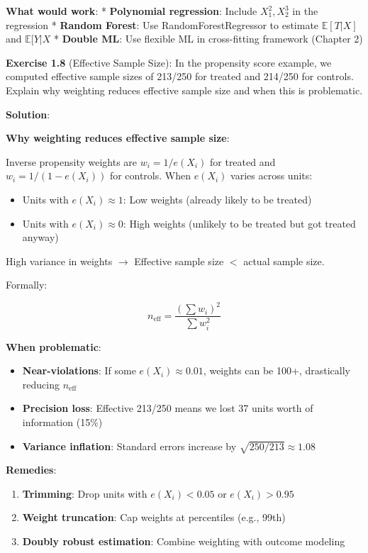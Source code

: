 \textbf{What would work}: * \textbf{Polynomial regression}: Include
\(X_1^2, X_2^3\) in the regression * \textbf{Random Forest}: Use
RandomForestRegressor to estimate \(\mathbb{E}[T|X]\) and
\(\mathbb{E}[Y|X\) * \textbf{Double ML}: Use flexible ML in
cross-fitting framework (Chapter 2)

\textbf{Exercise 1.8} (Effective Sample Size): In the propensity score
example, we computed effective sample sizes of 213/250 for treated and
214/250 for controls. Explain why weighting reduces effective sample
size and when this is problematic.

\textbf{Solution}:

\textbf{Why weighting reduces effective sample size}:

Inverse propensity weights are $w_i = 1/e(X_i)$ for treated and
$w_i = 1/(1-e(X_i))$ for controls. When $e(X_i)$ varies across units:
\begin{itemize}
\item Units with $e(X_i) \approx 1$: Low weights (already likely to be treated)
\item Units with $e(X_i) \approx 0$: High weights (unlikely to be treated but got treated anyway)
\end{itemize}

High variance in weights $\to$ Effective sample size $<$ actual sample size.

Formally:

\[n_{\text{eff}} = \frac{(\sum w_i)^2}{\sum w_i^2}\]

\textbf{When problematic}:
\begin{itemize}
\item \textbf{Near-violations}: If some $e(X_i) \approx 0.01$, weights can be 100+, drastically reducing $n_{\text{eff}}$
\item \textbf{Precision loss}: Effective 213/250 means we lost 37 units worth of information (15\%)
\item \textbf{Variance inflation}: Standard errors increase by $\sqrt{250/213} \approx 1.08$
\end{itemize}

\textbf{Remedies}:
\begin{enumerate}
\item \textbf{Trimming}: Drop units with $e(X_i) < 0.05$ or $e(X_i) > 0.95$
\item \textbf{Weight truncation}: Cap weights at percentiles (e.g., 99th)
\item \textbf{Doubly robust estimation}: Combine weighting with outcome modeling
\end{enumerate}


